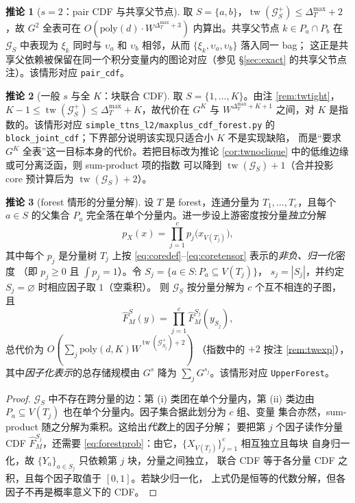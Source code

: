 \documentclass[a4paper,11pt]{article}
\theoremstyle{definition}
\newtheorem{corollary}{推论}
\newcommand{\1}{\mathbf 1}
\newcommand{\tw}{\operatorname{tw}}
\newcommand{\Gcal}{\mathcal G}
\begin{document}
\begin{corollary}[$s=2$：pair CDF 与共享父节点]
\label{cor:s2}
取 $S=\{a,b\}$，$\tw(\Gcal_S^{+})\le\Delta_T^{\max}+2$，故 $G^2$ 全表可在
$O(\mathrm{poly}(d)\cdot W^{\Delta_T^{\max}+3})$ 内算出。共享父节点
$k\in P_a\cap P_b$ 在 $\Gcal_S$ 中表现为 $\xi_k$ 同时与 $\upsilon_a$ 和
$\upsilon_b$ 相邻，从而 $\{\xi_k,\upsilon_a,\upsilon_b\}$ 落入同一 bag；
这正是共享父依赖被保留在同一个积分变量内的图论对应（参见
\S\ref{sec:exact} 的共享父节点注）。该情形对应
\texttt{pair\_cdf}。
\end{corollary}

\begin{corollary}[一般 $s$ 与全 $K$：块联合 CDF]
\label{cor:sK}
取 $S=\{1,\ldots,K\}$。由注 \ref{rem:twtight}，
$K-1\le\tw(\Gcal_S^{+})\le\Delta_T^{\max}+K$，故代价在 $G^{K}$ 与
$W^{\Delta_T^{\max}+K+1}$ 之间，对 $K$ 是指数的。该情形对应
\texttt{simple\_ttns\_l2/}\allowbreak\texttt{maxplus\_cdf\_forest.py} 的
\texttt{block\_joint\_cdf}；下界部分说明该实现只适合小 $K$ 不是实现缺陷，
而是“要求 $G^{K}$ 全表”这一目标本身的代价。若把目标改为推论
\ref{cor:twnoclique} 中的低维边缘或可分离泛函，则 sum-product 项的指数
可以降到 $\tw(\Gcal_S)+1$（合并投影 core 预计算后为 $\tw(\Gcal_S)+2$）。
\end{corollary}

\begin{corollary}[forest 情形的分量分解]
\label{cor:forest}
设 $T$ 是 forest，连通分量为 $T_1,\ldots,T_c$，且每个 $a\in S$ 的父集合
$P_a$ 完全落在单个分量内。进一步设上游密度按分量\emph{独立}分解
\begin{equation}
\label{eq:forestprob}
p_X(x)=\prod_{j=1}^{c}p_j\bigl(x_{V(T_j)}\bigr),
\end{equation}
其中每个 $p_j$ 是分量树 $T_j$ 上按
\eqref{eq:coredef}--\eqref{eq:coretensor} 表示的\emph{非负、归一化}密度
（即 $p_j\ge0$ 且 $\int p_j=1$）。令 $S_j=\{a\in S:P_a\subseteq V(T_j)\}$，
$s_j=|S_j|$，并约定 $S_j=\varnothing$ 时相应因子取 $1$（空乘积）。
则 $\Gcal_S$ 按分量分解为 $c$ 个互不相连的子图，且
\[
\widehat F^{S}_{M}(y)
=
\prod_{j=1}^{c}\widehat F^{S_j}_{M}\!\left(y_{S_j}\right),
\]
总代价为
$O\!\left(\sum_{j}\mathrm{poly}(d,K)W^{\tw(\Gcal_{S_j}^{+})+2}\right)$
（指数中的 $+2$ 按注 \ref{rem:twexp}），
其中\emph{因子化表示}的总存储规模由 $G^{s}$ 降为 $\sum_j G^{s_j}$。该情形对应
\texttt{UpperForest}。
\end{corollary}

\begin{proof}
$\Gcal_S$ 中不存在跨分量的边：第 (i) 类团在单个分量内，第 (ii) 类边由
$P_a\subseteq V(T_j)$ 也在单个分量内。因子集合据此划分为 $c$ 组、变量
集合亦然，sum-product 随之分解为乘积。这给出\emph{代数}上的因子分解；
要把第 $j$ 个因子读作分量 CDF $\widehat F^{S_j}_M$，还需要
\eqref{eq:forestprob}：由它，$\{X_{V(T_j)}\}_{j=1}^{c}$ 相互独立且每块
自身归一化，故 $\{Y_a\}_{a\in S_j}$ 只依赖第 $j$ 块，分量之间独立，
联合 CDF 等于各分量 CDF 之积，且每个因子取值于 $[0,1]$。若缺少归一化，
上式仍是恒等的代数分解，但各因子不再是概率意义下的 CDF。
\end{proof}
\end{document}
